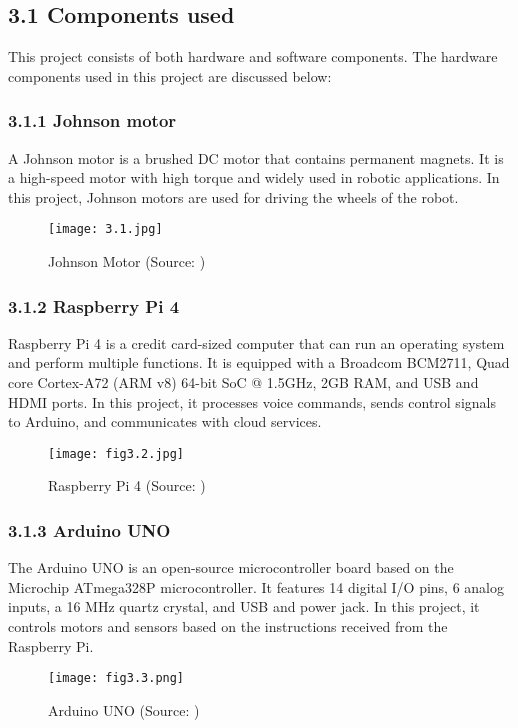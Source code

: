 \subsection*{3.1 Components used}
This project consists of both hardware and software components. The hardware components used in this project are discussed below:

\subsubsection*{3.1.1 Johnson motor}
A Johnson motor is a brushed DC motor that contains permanent magnets. It is a high-speed motor with high torque and widely used in robotic applications. In this project, Johnson motors are used for driving the wheels of the robot.

\begin{figure}[H]
    \centering
    \texttt{[image: 3.1.jpg]}
    \caption{Johnson Motor (Source: \cite{7})}
    \label{fig:3.1}
\end{figure}

\subsubsection*{3.1.2 Raspberry Pi 4}
Raspberry Pi 4 is a credit card-sized computer that can run an operating system and perform multiple functions. It is equipped with a Broadcom BCM2711, Quad core Cortex-A72 (ARM v8) 64-bit SoC @ 1.5GHz, 2GB RAM, and USB and HDMI ports. In this project, it processes voice commands, sends control signals to Arduino, and communicates with cloud services.

\begin{figure}[H]
    \centering
    \texttt{[image: fig3.2.jpg]}
    \caption{Raspberry Pi 4 (Source: \cite{8})}
    \label{fig:3.2}
\end{figure}

\subsubsection*{3.1.3 Arduino UNO}
The Arduino UNO is an open-source microcontroller board based on the Microchip ATmega328P microcontroller. It features 14 digital I/O pins, 6 analog inputs, a 16 MHz quartz crystal, and USB and power jack. In this project, it controls motors and sensors based on the instructions received from the Raspberry Pi.

\begin{figure}[H]
    \centering
    \texttt{[image: fig3.3.png]}
    \caption{Arduino UNO (Source: \cite{9})}
    \label{fig:3.3}
\end{figure}

